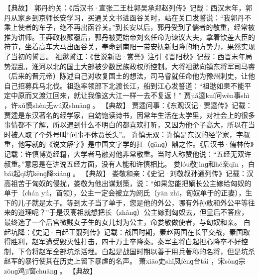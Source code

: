 \documentclass[12pt,UTF8]{ctexbook}
\begin{document}
【典故】
郭丹约关：《后汉书·宣张二王杜郭吴承郑赵列传》记载：西汉末年，郭丹从家乡到京师长安学习，买通关文书进函谷关时，站在关口发誓说：“我郭丹不乘上使者的车子，绝不再出函谷关。”到长安以后，郭丹受到了儒者的敬重，经常被推为讲师。王莽政权颠覆后，郭丹被更始帝刘玄任命为谏议大夫，拿着钦差大臣的符节，坐着高车大马出函谷关，奉命到南阳一带安抚新归降的地方势力，果然实现了当初的誓言。
祖逖誓江：《世说新语·赏誉》注引《晋阳秋》记载：西晋末年局势混乱，淮河以北的国土大部被少数民族政权所控制。大将祖逖向镇东将军司马睿（后来的晋元帝）陈述自己对收复国土的想法，司马睿就任命他为豫州刺史，让他自己招募兵马北伐。祖逖率领部下北渡长江，船到江心发誓道：“祖逖如果不能平定中原而又渡江回来，就让我像这大江一样一去不复返！”
贾jiǎ逵kuí问wèn事shì
，许xǔ慎shèn无wú双shuānɡ
。
【典故】
贾逵问事：《东观汉记·贾逵传》记载：贾逵是东汉著名的经学家，自幼饱读诗书，因常年生活在太学里，对社会上的很多事情都不了解，所以遇到什么不明白的都喜欢打听，又因为他个子高大，所以在当时被人取了个外号叫“问事不休贾长头”。
许慎无双：许慎是东汉的经学家，字叔重，他写就的《说文解字》是中国文字学的扛（ɡānɡ）鼎之作。《后汉书·儒林传》记载：许慎博览经籍，大学者马融对他非常敬重。当时人称赞他说：“五经无双许叔重。”意思是在讲说五经方面，没有人能和许慎相比。
娄lóu敬jìnɡ和hé亲qīn
，白bái起qǐ坑kēnɡ降xiánɡ
。
【典故】
娄敬和亲：《史记·刘敬叔孙通列传》记载：汉高祖苦于匈奴的侵扰，娄敬为他出谋划策，说：“如果您能把嫡长公主嫁给匈奴的单于（chán yú，首领），公主一定会被立为阏氏（yān zhī，匈奴单于的正妻），生下的儿子就是太子。等到太子当了单于，您是他的外公，哪有外孙敢和外公平等往来的道理呢？”于是汉高祖就想把长（zhǎnɡ）公主嫁到匈奴去，但皇后不答应，最终选了一个后宫微贱女子生的女儿封为公主，命娄敬做使者，与匈奴和亲。
白起坑降：《史记·白起王翦列传》记载：战国时期，秦赵两国在长平交战，秦国取得胜利，赵军遭受毁灭性打击，四十万士卒降秦。秦军主将白起担心降卒不好控制，下令将赵军全部坑杀活埋。白起是战国时期以善于用兵著称的名将，但是坑杀赵军的暴行使其在历史上留下暴虐的名声。
萧xiāo史shǐ凤fènɡ台tái
，宋sònɡ宗zōnɡ鸡jī窗chuānɡ
。
【典故】
\end{document}
